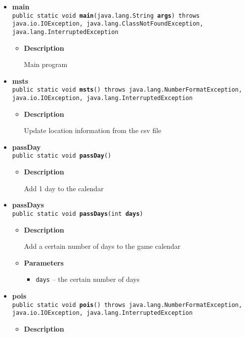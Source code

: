 {{{{{\begin{itemize}
{\begin{itemize}
{Update location information from the csv file
}
\end{itemize}
}%
\item{ 
{\bf  main}\\
\texttt{public static void\ {\bf  main}(\texttt{java.lang.String\lbrack \rbrack } {\bf  args}) throws java.io.IOException, java.lang.ClassNotFoundException, java.lang.InterruptedException
\label{personOfInterest.Game.main(java.lang.String[])}}%
\begin{itemize}
\item{
{\bf  Description}

Main program
}
\end{itemize}
}%
\item{ 
{\bf  msts}\\
\texttt{public static void\ {\bf  msts}() throws java.lang.NumberFormatException, java.io.IOException, java.lang.InterruptedException
\label{personOfInterest.Game.msts()}}%
\begin{itemize}
\item{
{\bf  Description}

Update location information from the csv file
}
\end{itemize}
}%
\item{ 
{\bf  passDay}\\
\texttt{public static void\ {\bf  passDay}()
\label{personOfInterest.Game.passDay()}}%
\begin{itemize}
\item{
{\bf  Description}

Add 1 day to the calendar
}
\end{itemize}
}%
\item{ 
{\bf  passDays}\\
\texttt{public static void\ {\bf  passDays}(\texttt{int} {\bf  days})
\label{personOfInterest.Game.passDays(int)}}%
\begin{itemize}
\item{
{\bf  Description}

Add a certain number of days to the game calendar
}
\item{
{\bf  Parameters}
  \begin{itemize}
   \item{
\texttt{days} -- the certain number of days}
  \end{itemize}
}%
\end{itemize}
}%
\item{ 
{\bf  pois}\\
\texttt{public static void\ {\bf  pois}() throws java.lang.NumberFormatException, java.io.IOException, java.lang.InterruptedException
\label{personOfInterest.Game.pois()}}%
\begin{itemize}
\item{
{\bf  Description}

}
\end{itemize}}
\end{itemize}}}}}}
